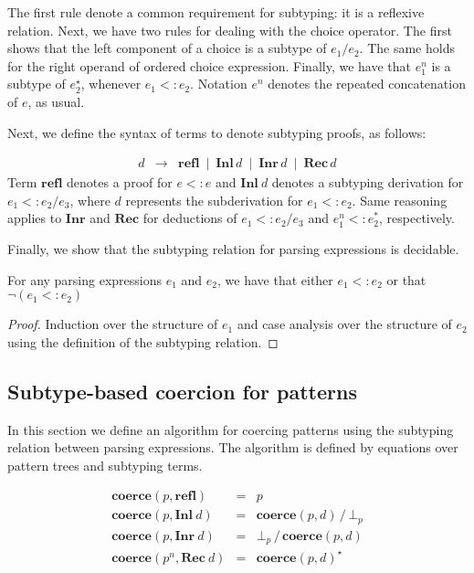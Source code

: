 The first rule denote a common requirement for subtyping: it is
a reflexive relation. Next, we have two rules for dealing
with the choice operator. The first shows that the left component of a choice
is a subtype of $e_1/e_2$. The same holds for the right operand of ordered choice
expression. Finally, we have that $e_1^n$ is a subtype of $e_2^\star$, whenever
$e_1 <: e_2$. Notation $e^n$ denotes the repeated concatenation of $e$, as usual.

Next, we define the syntax of terms to denote subtyping proofs, as follows:

\[
  \begin{array}{lcl}
    d & \to & \mathbf{refl}
      \: \mid \: \mathbf{Inl}\,d
      \: \mid \: \mathbf{Inr}\,d
      \: \mid \: \mathbf{Rec}\,d
  \end{array}
\]
Term $\mathbf{refl}$ denotes a proof for $e<:e$ and $\mathbf{Inl}\:d$ denotes
a subtyping derivation for $e_1 <:e_2 / e_3$, where $d$ represents the
subderivation for $e_1 <: e_2$. Same reasoning applies to $\mathbf{Inr}$ and
$\mathbf{Rec}$ for deductions of $e_1 <: e_2 / e_3$ and $e_1^n <: e_2^*$,
respectively.

Finally, we show that the subtyping relation for parsing expressions is
decidable.

\begin{theorem}
  For any parsing expressions $e_1$ and $e_2$, we have that either $e_1 <: e_2$ or
  that $\neg (e_1 <: e_2)$
\end{theorem}
\begin{proof}
  Induction over the structure of $e_1$ and case analysis over the structure of $e_2$
  using the definition of the subtyping relation.
\end{proof}


\subsection{Subtype-based coercion for patterns}

In this section we define an algorithm for coercing patterns using the subtyping
relation between parsing expressions. The algorithm is defined by equations over
pattern trees and subtyping terms.

\[
  \begin{array}{lcl}
    \mathbf{coerce}(p,\mathbf{refl}) & = & p\\
    \mathbf{coerce}(p,\mathbf{Inl}\:d) & = & \mathbf{coerce}(p,d)\,/\,\bot_p\\
    \mathbf{coerce}(p,\mathbf{Inr}\:d) & = & \bot_p\,/\,\mathbf{coerce}(p,d)\\
    \mathbf{coerce}(p^n,\mathbf{Rec}\:d) & = & \mathbf{coerce}(p,d)^\star\\
  \end{array}
\]

